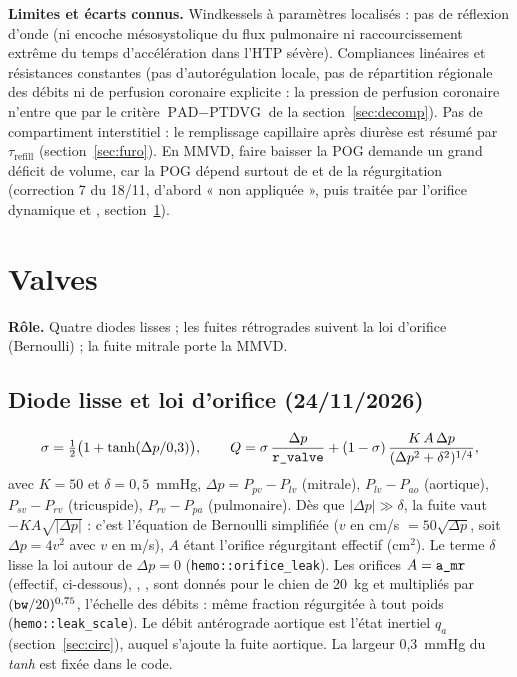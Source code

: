 \documentclass[10pt,a4paper]{article}
\newcommand{\cmd}[1]{\texttt{#1}}
\newcommand{\vp}[1]{\text{\texttt{\detokenize{#1}}}}
\newcommand{\limite}[1]{\par\textbf{Limites et écarts connus.} #1}
\begin{document}
\limite{Windkessels à paramètres localisés : pas de réflexion d'onde (ni encoche mésosystolique du flux pulmonaire ni raccourcissement extrême du temps d'accélération dans l'HTP sévère). Compliances linéaires et résistances constantes (pas d'autorégulation locale, pas de répartition régionale des débits ni de perfusion coronaire explicite : la pression de perfusion coronaire n'entre que par le critère $\text{PAD} - \text{PTDVG}$ de la section~\ref{sec:decomp}). Pas de compartiment interstitiel : le remplissage capillaire après diurèse est résumé par $\tau_\text{refill}$ (section~\ref{sec:furo}). En MMVD, faire baisser la POG demande un grand déficit de volume, car la POG dépend surtout de \vp{c_pv} et de la régurgitation (correction 7 du 18/11, d'abord « non appliquée », puis traitée par l'orifice dynamique et \vp{ven_cap}, section~\ref{sec:valves}).}

\section{Valves}\label{sec:valves}

\textbf{Rôle.} Quatre diodes lisses ; les fuites rétrogrades suivent la loi d'orifice (Bernoulli) ; la fuite mitrale porte la MMVD.

\subsection{Diode lisse et loi d'orifice (24/11/2026)}
\begin{equation}
\sigma = \tfrac12\bigl(1 + \tanh(\Delta p/0{,}3)\bigr), \qquad
Q = \sigma\,\frac{\Delta p}{\vp{r_valve}} + (1 - \sigma)\,\frac{K\,A\,\Delta p}{(\Delta p^2 + \delta^2)^{1/4}},
\end{equation}
avec $K = 50$ et $\delta = 0{,}5$~mmHg,
$\Delta p = P_{pv} - P_{lv}$ (mitrale), $P_{lv} - P_{ao}$ (aortique), $P_{sv} - P_{rv}$ (tricuspide), $P_{rv} - P_{pa}$ (pulmonaire). Dès que $|\Delta p| \gg \delta$, la fuite vaut $-K A\sqrt{|\Delta p|}$ : c'est l'équation de Bernoulli simplifiée ($v$ en cm/s $= 50\sqrt{\Delta p}$, soit $\Delta p = 4v^2$ avec $v$ en m/s), $A$ étant l'orifice régurgitant effectif (cm$^2$). Le terme $\delta$ lisse la loi autour de $\Delta p = 0$ (\cmd{hemo::orifice\_leak}). Les orifices $A = \vp{a_mr}$ (effectif, ci-dessous), \vp{a_ar}, \vp{a_tr}, \vp{a_pr} sont donnés pour le chien de 20~kg et multipliés par $(\vp{bw}/20)^{0{,}75}$, l'échelle des débits : même fraction régurgitée à tout poids (\cmd{hemo::leak\_scale}). Le débit antérograde aortique est l'état inertiel $q_a$ (section~\ref{sec:circ}), auquel s'ajoute la fuite aortique. La largeur 0,3~mmHg du \emph{tanh} est fixée dans le code.
\end{document}

